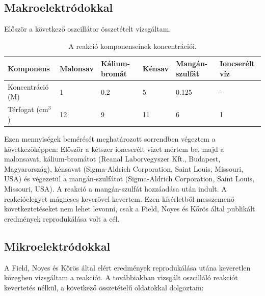 \subsection{Makroelektródokkal}
Először a következő oszcillátor összetételt vizsgáltam.
\begin{table}[h!]
\centering
\caption{A reakció komponenseinek koncentrációi.}
\label{my-label}
\begin{tabular}{llllll}
Komponens                       & Malonsav & Kálium-bromát & Kénsav & Mangán-szulfát & Ioncserélt víz \\
\hline
Koncentráció (M)                & 1        & 0.2           & 5      & 0.125          & -              \\
Térfogat (cm$^3$) & 12       & 9             & 11     & 6              & 1              \\
\end{tabular}
\end{table}
Ezen mennyiségek bemérését meghatározott sorrendben végeztem a következőképpen: Először a kétszer ioncserélt vizet mértem be, majd a malonsavat, kálium-bromátot (Reanal Laborvegyszer Kft., Budapest, Magyarország), kénsavat (Sigma-Aldrich Corporation, Saint Louis, Missouri, USA) és végezetül a mangán-szulfátot (Sigma-Aldrich Corporation, Saint Louis, Missouri, USA). A reakció a mangán-szulfát hozzáadása után indult. A reakcióelegyet mágneses keverővel kevertem. Ezen kísérletből messzemenő következtetéseket nem lehet levonni, csak a Field, Noyes és Kőrös által publikált eredmények reprodukálása \cite{noyes1972oscillations} volt a cél.

\subsection{Mikroelektródokkal} \label{mikroelektrod}

A Field, Noyes és Kőrös által elért eredmények reprodukálása utána \cite{noyes1972oscillations} keveretlen közegben vizsgáltam a reakciót.
A továbbiakban vizsgált oszcilláló reakciót kevertetés nélkül, a következő összetételű oldatokkal dolgoztam: 

